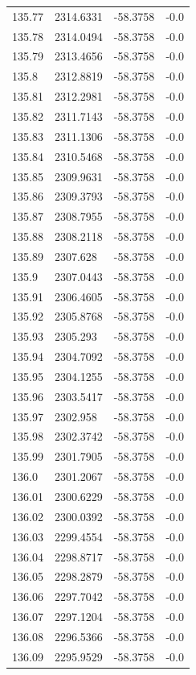 \begin{table}[H]
\begin{tabular}{llll}
135.77 & 2314.6331 & -58.3758 & -0.0 \\
135.78 & 2314.0494 & -58.3758 & -0.0 \\
135.79 & 2313.4656 & -58.3758 & -0.0 \\
135.8 & 2312.8819 & -58.3758 & -0.0 \\
135.81 & 2312.2981 & -58.3758 & -0.0 \\
135.82 & 2311.7143 & -58.3758 & -0.0 \\
135.83 & 2311.1306 & -58.3758 & -0.0 \\
135.84 & 2310.5468 & -58.3758 & -0.0 \\
135.85 & 2309.9631 & -58.3758 & -0.0 \\
135.86 & 2309.3793 & -58.3758 & -0.0 \\
135.87 & 2308.7955 & -58.3758 & -0.0 \\
135.88 & 2308.2118 & -58.3758 & -0.0 \\
135.89 & 2307.628 & -58.3758 & -0.0 \\
135.9 & 2307.0443 & -58.3758 & -0.0 \\
135.91 & 2306.4605 & -58.3758 & -0.0 \\
135.92 & 2305.8768 & -58.3758 & -0.0 \\
135.93 & 2305.293 & -58.3758 & -0.0 \\
135.94 & 2304.7092 & -58.3758 & -0.0 \\
135.95 & 2304.1255 & -58.3758 & -0.0 \\
135.96 & 2303.5417 & -58.3758 & -0.0 \\
135.97 & 2302.958 & -58.3758 & -0.0 \\
135.98 & 2302.3742 & -58.3758 & -0.0 \\
135.99 & 2301.7905 & -58.3758 & -0.0 \\
136.0 & 2301.2067 & -58.3758 & -0.0 \\
136.01 & 2300.6229 & -58.3758 & -0.0 \\
136.02 & 2300.0392 & -58.3758 & -0.0 \\
136.03 & 2299.4554 & -58.3758 & -0.0 \\
136.04 & 2298.8717 & -58.3758 & -0.0 \\
136.05 & 2298.2879 & -58.3758 & -0.0 \\
136.06 & 2297.7042 & -58.3758 & -0.0 \\
136.07 & 2297.1204 & -58.3758 & -0.0 \\
136.08 & 2296.5366 & -58.3758 & -0.0 \\
136.09 & 2295.9529 & -58.3758 & -0.0 \\

\end{tabular}
\end{table}
